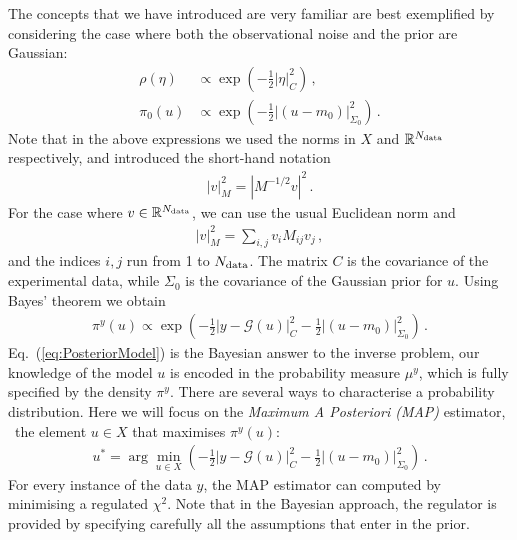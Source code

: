 The concepts that we have introduced are very familiar are best exemplified
by considering the case where both the observational noise and the
prior are Gaussian:
\begin{align}
  \label{eq:RhoGauss}
  \rho(\eta) &\propto \exp\left(
               -\frac12 \left|\eta\right|_C^2
               \right)\, , \\
  \label{eq:PiZeroGauss}
  \pi_0(u)  &\propto \exp\left(
              -\frac12 \left|(u-m_0)\right|_{\Sigma_0}^2
              \right)\, .
\end{align}
Note that in the above expressions we used the norms in $X$ and
$\mathbb{R}^{N_{\rm data}}$ respectively, and introduced the short-hand
notation
\begin{align}
  \left|v\right|_M^2 = \left| M^{-1/2} v\right|^2\, .
\end{align}
For the case where $v \in \mathbb{R}^{N_{\rm data}}$, we can use the usual
Euclidean norm  and
\begin{align}
  \left|v\right|_M^2 = \sum_{i,j} v_i M_{ij} v_j\, ,
\end{align}
and the indices $i,j$ run from 1 to $N_{\rm data}$.  The matrix $C$ is the
covariance of the experimental data, while $\Sigma_0$ is the
covariance of the Gaussian prior for $u$. Using Bayes' theorem we
obtain
\begin{align}
  \label{eq:PosteriorModel}
  \pi^y(u) \propto 
  \exp\left(
  -\frac12 \left|y - \mathcal G(u)\right|_C^2
  -\frac12 \left|(u-m_0)\right|_{\Sigma_0}^2
  \right)\, .
\end{align}
Eq.~(\ref{eq:PosteriorModel}) is the Bayesian answer to the inverse
problem, our knowledge of the model $u$ is encoded in the probability
measure $\mu^y$, which is fully specified by the density
$\pi^y$. There are several ways to characterise a probability
distribution. Here we will focus on the {\em Maximum A Posteriori
  (MAP)} estimator, \ie\ the element $u \in X$ that maximises
$\pi^y(u)$:
\begin{align}
  u^* = \arg\min_{u \in X} 
  \left(
  -\frac12 \left|y - \mathcal G(u)\right|_C^2
  -\frac12 \left|(u-m_0)\right|_{\Sigma_0}^2
  \right)\, .
\end{align}
For every instance of the data $y$, the MAP estimator can computed by
minimising a regulated $\chi^2$. Note that in the Bayesian approach,
the regulator is provided by specifying carefully all the assumptions
that enter in the prior. 

